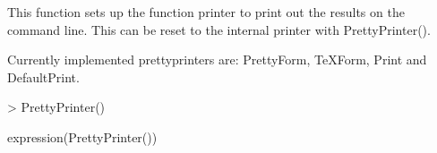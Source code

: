 \documentclass[10pt]{article}
\newcommand{\yacas}{{\tt yacas}}
\begin{document}
This function sets up the function printer to print out the results on
the command line. This can be reset to the internal printer with
PrettyPrinter().

Currently implemented prettyprinters are: PrettyForm, TeXForm, Print
and DefaultPrint.

\begin{Schunk}
\begin{Sinput}
> PrettyPrinter()
\end{Sinput}
\begin{Soutput}
expression(PrettyPrinter())
\end{Soutput}
\end{Schunk}





\end{document}
